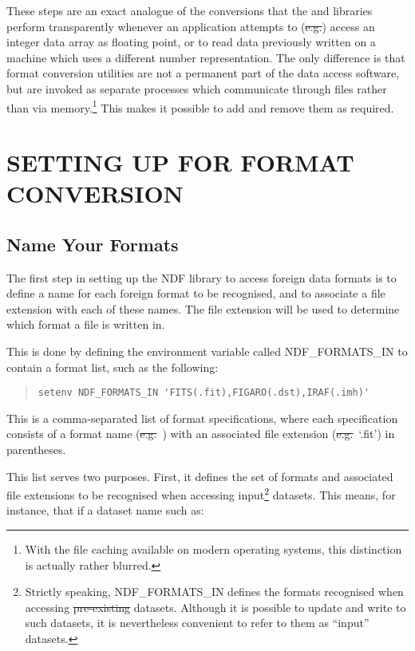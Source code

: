 These steps are an exact analogue of the conversions that the
 and  libraries perform
transparently whenever an application attempts to (\st{e.g.}\/)
access an integer data array as floating point, or to read data
previously written on a machine which uses a different number
representation. The only difference is that format conversion
utilities are not a permanent part of the data access software, but
are invoked as separate processes which communicate through files
rather than via memory.\footnote{With the file caching available on
modern operating systems, this distinction is actually rather
blurred.} This makes it possible to add and remove them as required.

\section{SETTING UP FOR FORMAT CONVERSION}

\subsection{\label{sect:inputformats}Name Your Formats}

The first step in setting up the NDF library to access foreign data
formats is to define a name for each foreign format to be recognised,
and to associate a file extension with each of these names. The file
extension will be used to determine which format a file is written in.

This is done by defining the environment variable called
NDF\_FORMATS\_IN to contain a format list, such as the following:

\begin{quote}
\begin{small}
\begin{verbatim}
setenv NDF_FORMATS_IN 'FITS(.fit),FIGARO(.dst),IRAF(.imh)'
\end{verbatim}
\end{small}
\end{quote}

This is a comma-separated list of format specifications, where each
specification consists of a format name
(\st{e.g.}\ ) with an associated
file extension (\st{e.g.}\ `.fit') in parentheses.

This list serves two purposes. First, it defines the set of formats
and associated file extensions to be recognised when accessing
input\footnote{Strictly speaking, NDF\_FORMATS\_IN defines the formats
recognised when accessing \st{pre-existing} datasets. Although it is
possible to update and write to such datasets, it is nevertheless
convenient to refer to them as ``input'' datasets.} datasets. This
means, for instance, that if a dataset name such as:

